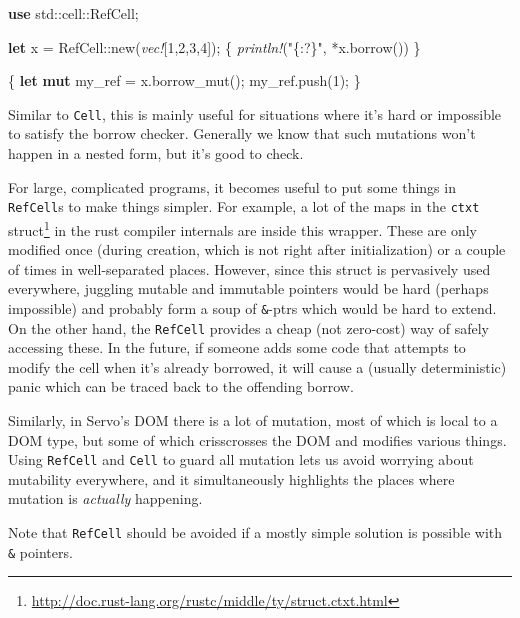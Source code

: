 \documentclass[a4paper,]{book}
\newenvironment{Shaded}{\begin{snugshade}}{\end{snugshade}}
\newcommand{\KeywordTok}[1]{\textcolor[rgb]{0.13,0.29,0.53}{\textbf{{#1}}}}
\newcommand{\DecValTok}[1]{\textcolor[rgb]{0.00,0.00,0.81}{{#1}}}
\newcommand{\StringTok}[1]{\textcolor[rgb]{0.31,0.60,0.02}{{#1}}}
\newcommand{\PreprocessorTok}[1]{\textcolor[rgb]{0.56,0.35,0.01}{\textit{{#1}}}}
\newcommand{\NormalTok}[1]{{#1}}
\renewcommand{\href}[2]{#2\footnote{\url{#1}}}
\begin{document}
\begin{Shaded}
\begin{Highlighting}[]
\KeywordTok{use} \NormalTok{std::cell::RefCell;}

\KeywordTok{let} \NormalTok{x = RefCell::new(}\PreprocessorTok{vec!}\NormalTok{[}\DecValTok{1}\NormalTok{,}\DecValTok{2}\NormalTok{,}\DecValTok{3}\NormalTok{,}\DecValTok{4}\NormalTok{]);}
\NormalTok{\{}
    \PreprocessorTok{println!}\NormalTok{(}\StringTok{"\{:?\}"}\NormalTok{, *x.borrow())}
\NormalTok{\}}

\NormalTok{\{}
    \KeywordTok{let} \KeywordTok{mut} \NormalTok{my_ref = x.borrow_mut();}
    \NormalTok{my_ref.push(}\DecValTok{1}\NormalTok{);}
\NormalTok{\}}
\end{Highlighting}
\end{Shaded}

Similar to \texttt{Cell}, this is mainly useful for situations where
it's hard or impossible to satisfy the borrow checker. Generally we know
that such mutations won't happen in a nested form, but it's good to
check.

For large, complicated programs, it becomes useful to put some things in
\texttt{RefCell}s to make things simpler. For example, a lot of the maps
in \href{http://doc.rust-lang.org/rustc/middle/ty/struct.ctxt.html}{the
\texttt{ctxt} struct} in the rust compiler internals are inside this
wrapper. These are only modified once (during creation, which is not
right after initialization) or a couple of times in well-separated
places. However, since this struct is pervasively used everywhere,
juggling mutable and immutable pointers would be hard (perhaps
impossible) and probably form a soup of \texttt{\&}-ptrs which would be
hard to extend. On the other hand, the \texttt{RefCell} provides a cheap
(not zero-cost) way of safely accessing these. In the future, if someone
adds some code that attempts to modify the cell when it's already
borrowed, it will cause a (usually deterministic) panic which can be
traced back to the offending borrow.

Similarly, in Servo's DOM there is a lot of mutation, most of which is
local to a DOM type, but some of which crisscrosses the DOM and modifies
various things. Using \texttt{RefCell} and \texttt{Cell} to guard all
mutation lets us avoid worrying about mutability everywhere, and it
simultaneously highlights the places where mutation is \emph{actually}
happening.

Note that \texttt{RefCell} should be avoided if a mostly simple solution
is possible with \texttt{\&} pointers.
\end{document}
